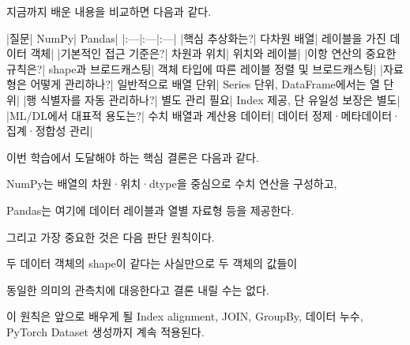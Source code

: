 지금까지 배운 내용을 비교하면 다음과 같다.

\begin{dhktable}
|질문|	NumPy|	Pandas|
|:---|:---|:---|
|핵심 추상화는?|	다차원 배열|	레이블을 가진 데이터 객체|
|기본적인 접근 기준은?|	차원과 위치|	위치와 레이블|
|이항 연산의 중요한 규칙은?|	shape과 브로드캐스팅|	객체 타입에 따른 레이블 정렬 및 브로드캐스팅|
|자료형은 어떻게 관리하나?|	일반적으로 배열 단위|	Series 단위, DataFrame에서는 열 단위|
|행 식별자를 자동 관리하나?|	별도 관리 필요|	Index 제공, 단 유일성 보장은 별도|
|ML/DL에서 대표적 용도는?|	수치 배열과 계산용 데이터|	데이터 정제·메타데이터·집계·정합성 관리|
\end{dhktable}

이번 학습에서 도달해야 하는 핵심 결론은 다음과 같다.

\begin{dhksmry}[centered]
NumPy는 배열의 차원·위치·dtype을 중심으로 수치 연산을 구성하고,

Pandas는 여기에 데이터 레이블과 열별 자료형 등을 제공한다.
\end{dhksmry}

그리고 가장 중요한 것은 다음 판단 원칙이다.

\begin{dhksmry}[centered]
두 데이터 객체의 shape이 같다는 사실만으로 두 객체의 값들이 

동일한 의미의 관측치에 대응한다고 결론 내릴 수는 없다.
\end{dhksmry}

이 원칙은 앞으로 배우게 될 Index alignment, JOIN, GroupBy, 데이터 누수, PyTorch Dataset 생성까지 계속 적용된다.